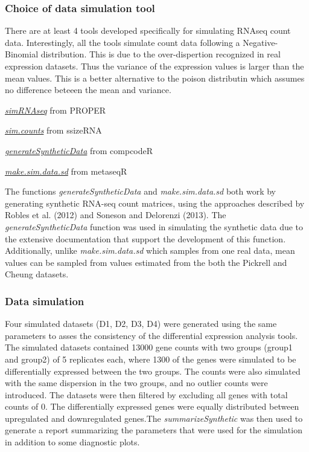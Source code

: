 \documentclass[]{article}
\begin{document}
\hypertarget{choice-of-data-simulation-tool}{%
\subsubsection{Choice of data simulation
tool}\label{choice-of-data-simulation-tool}}

There are at least 4 tools developed specifically for simulating RNAseq
count data. Interestingly, all the tools simulate count data following a
Negative-Binomial distribution. This is due to the over-dispertion
recognized in real expression datasets. Thus the variance of the
expression values is larger than the mean values. This is a better
alternative to the poison distributin which assumes no difference
beteeen the mean and variance.

\href{https://rdrr.io/bioc/PROPER/man/simRNAseq.html}{\emph{simRNAseq}}
from PROPER

\href{chrome-extension://cbnaodkpfinfiipjblikofhlhlcickei/src/pdfviewer/web/viewer.html?file=https://cran.r-project.org/web/packages/ssizeRNA/ssizeRNA.pdf}{\emph{sim.counts}}
from ssizeRNA

\href{https://bioconductor.org/packages/release/bioc/manuals/compcodeR/man/compcodeR.pdf}{\emph{generateSyntheticData}}
from compcodeR

\href{https://www.rdocumentation.org/packages/metaseqR/versions/1.12.2/topics/make.sim.data.sd}{\emph{make.sim.data.sd}}
from metaseqR

The functions \emph{generateSyntheticData} and \emph{make.sim.data.sd}
both work by generating synthetic RNA-seq count matrices, using the
approaches described by Robles et al. (2012) and Soneson and Delorenzi
(2013). The \emph{generateSyntheticData} function was used in simulating
the synthetic data due to the extensive documentation that support the
development of this function. Additionally, unlike
\emph{make.sim.data.sd} which samples from one real data, mean values
can be sampled from values estimated from the both the Pickrell and
Cheung datasets.

\hypertarget{data-simulation}{%
\subsubsection{Data simulation}\label{data-simulation}}

Four simulated datasets (D1, D2, D3, D4) were generated using the same
parameters to asses the consistency of the differential expression
analysis tools. The simulated datasets contained 13000 gene counts with
two groups (group1 and group2) of 5 replicates each, where 1300 of the
genes were simulated to be differentially expressed between the two
groups. The counts were also simulated with the same dispersion in the
two groups, and no outlier counts were introduced. The datasets were
then filtered by excluding all genes with total counts of 0. The
differentially expressed genes were equally distributed between
upregulated and downregulated genes.The \emph{summarizeSynthetic} was
then used to generate a report summarizing the parameters that were used
for the simulation in addition to some diagnostic plots.
\end{document}
